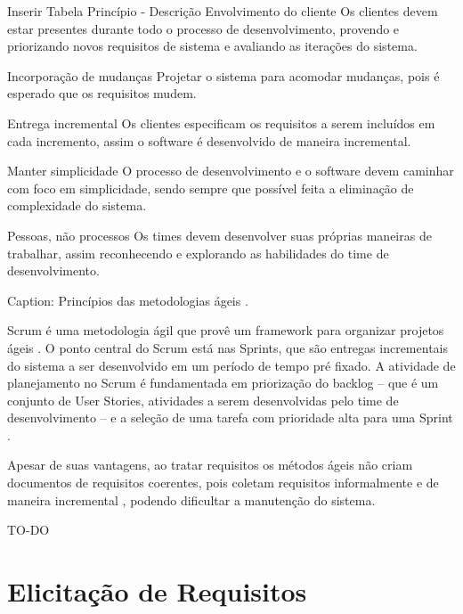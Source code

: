 Inserir Tabela
Princípio - Descrição
Envolvimento do cliente
Os clientes devem estar presentes durante todo o processo de desenvolvimento, provendo e priorizando novos requisitos de sistema e avaliando as iterações do sistema.

Incorporação de mudanças
Projetar o sistema para acomodar mudanças, pois é esperado que os requisitos mudem.

Entrega incremental
Os clientes especificam os requisitos a serem incluídos em cada incremento, assim o software é desenvolvido de maneira incremental.

Manter simplicidade
O processo de desenvolvimento e o software devem caminhar com foco em simplicidade, sendo sempre que possível feita a eliminação de complexidade do sistema.

Pessoas, não processos
Os times devem desenvolver suas próprias maneiras de trabalhar, assim reconhecendo e explorando as habilidades do time de desenvolvimento.

Caption: Princípios das metodologias ágeis \cite{sommerville2015software}.




Scrum é uma metodologia ágil que provê um framework para organizar projetos ágeis \cite{sommerville2015software}. O ponto central do Scrum está nas Sprints, que são entregas incrementais do sistema a ser desenvolvido em um período de tempo pré fixado. A atividade de planejamento no Scrum é fundamentada em priorização do backlog -- que é um conjunto de User Stories, atividades a serem desenvolvidas pelo time de desenvolvimento -- e a seleção de uma tarefa com prioridade alta para uma Sprint \cite{sommerville2015software}.


Apesar de suas vantagens, ao tratar requisitos os métodos ágeis não criam documentos de requisitos coerentes, pois coletam requisitos informalmente e de maneira incremental \cite{sommerville2015software}, podendo dificultar a manutenção do sistema.

TO-DO

\section{Elicitação de Requisitos}

